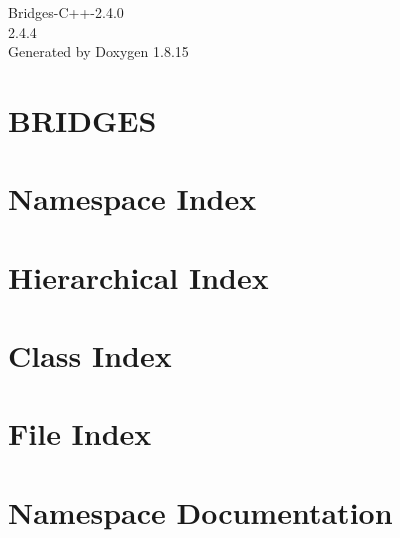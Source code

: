\let\mypdfximage\pdfximage\def\pdfximage{\immediate\mypdfximage}\documentclass[twoside]{book}
\newcommand{\+}{\discretionary{\mbox{\scriptsize$\hookleftarrow$}}{}{}}
\newcommand{\clearemptydoublepage}{%
  \newpage{\pagestyle{empty}\cleardoublepage}%
}
\begin{document}
\hypersetup{pageanchor=false,
             bookmarksnumbered=true,
             pdfencoding=unicode
            }
\begin{titlepage}
\vspace*{7cm}
\begin{center}%
{\Large Bridges-\/\+C++-\/2.4.0 \\[1ex]\large 2.\+4.\+4 }\\
\vspace*{1cm}
{\large Generated by Doxygen 1.8.15}\\
\end{center}
\end{titlepage}
\clearemptydoublepage
{}
\tableofcontents
\clearemptydoublepage
{}
\hypersetup{pageanchor=true}

\chapter{B\+R\+I\+D\+G\+ES}
\label{index}\hypertarget{index}{}
\chapter{Namespace Index}

\chapter{Hierarchical Index}

\chapter{Class Index}

\chapter{File Index}

\chapter{Namespace Documentation}



\end{document}

